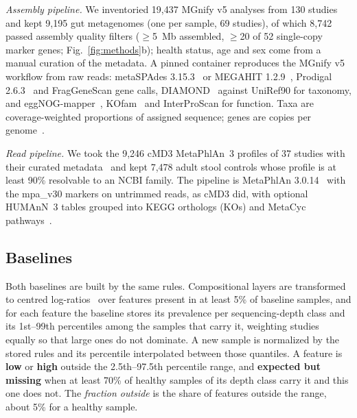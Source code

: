\documentclass[conference]{IEEEtran}
\begin{document}
\emph{Assembly pipeline.} We inventoried 19{,}437 MGnify v5 analyses from 130 studies and kept 9{,}195 gut metagenomes (one per sample, 69 studies), of which 8{,}742 passed assembly quality filters ($\geq$5~Mb assembled, $\geq$20 of 52 single-copy marker genes; Fig.~\ref{fig:methods}b); health status, age and sex come from a manual curation of the metadata. A pinned container reproduces the MGnify v5 workflow from raw reads: metaSPAdes 3.15.3~\cite{nurk2017} or MEGAHIT 1.2.9~\cite{li2015}, Prodigal 2.6.3~\cite{hyatt2010} and FragGeneScan gene calls, DIAMOND~\cite{buchfink2015} against UniRef90 for taxonomy, and eggNOG-mapper~\cite{huerta2017}, KOfam~\cite{aramaki2020} and InterProScan for function. Taxa are coverage-weighted proportions of assigned sequence; genes are copies per genome~\cite{nayfach2015}.

\emph{Read pipeline.} We took the 9{,}246 cMD3 MetaPhlAn~3 profiles of 37 studies with their curated metadata~\cite{antonello2025} and kept 7{,}478 adult stool controls whose profile is at least 90\% resolvable to an NCBI family. The pipeline is MetaPhlAn 3.0.14~\cite{beghini2021} with the mpa\_v30 markers on untrimmed reads, as cMD3 did, with optional HUMAnN~3 tables grouped into KEGG orthologs (KOs) and MetaCyc pathways~\cite{caspi2020}.

\subsection{Baselines}

Both baselines are built by the same rules. Compositional layers are transformed to centred log-ratios~\cite{aitchison1982} over features present in at least 5\% of baseline samples, and for each feature the baseline stores its prevalence per sequencing-depth class and its 1st--99th percentiles among the samples that carry it, weighting studies equally so that large ones do not dominate. A new sample is normalized by the stored rules and its percentile interpolated between those quantiles. A feature is \textbf{low} or \textbf{high} outside the 2.5th--97.5th percentile range, and \textbf{expected but missing} when at least 70\% of healthy samples of its depth class carry it and this one does not. The \emph{fraction outside} is the share of features outside the range, about 5\% for a healthy sample.
\end{document}
